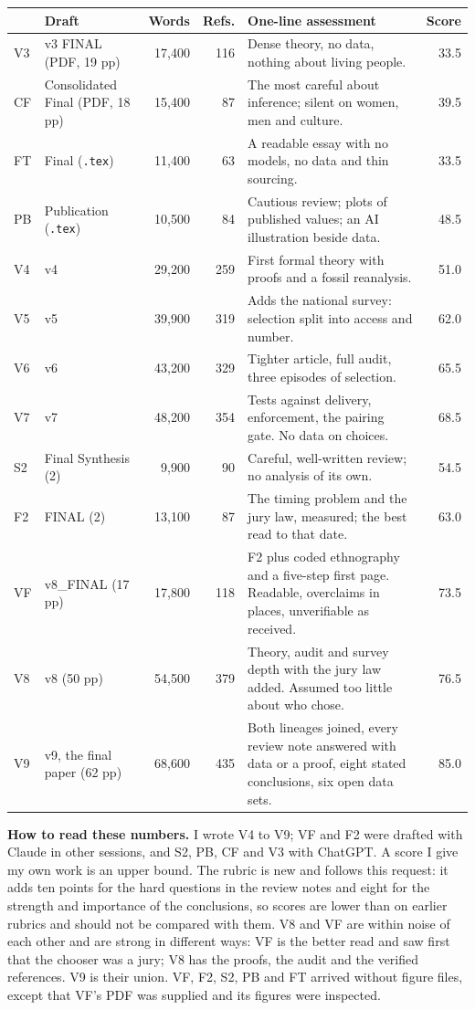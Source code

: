 \documentclass[10pt,letterpaper]{extarticle}
\newcommand{\TotVthree}{33.5}
\newcommand{\TotCF}{39.5}
\newcommand{\TotFT}{33.5}
\newcommand{\TotPB}{48.5}
\newcommand{\TotVfour}{51.0}
\newcommand{\TotVfive}{62.0}
\newcommand{\TotVsix}{65.5}
\newcommand{\TotVseven}{68.5}
\newcommand{\TotFtwo}{63.0}
\newcommand{\TotStwo}{54.5}
\newcommand{\TotVeight}{76.5}
\newcommand{\TotVF}{73.5}
\newcommand{\TotVnine}{85.0}
\begin{document}
\begin{tabularx}{\textwidth}{@{}P{0.035\textwidth}P{0.21\textwidth}rrLr@{}}
\toprule
 & Draft & Words & Refs. & One-line assessment & Score\\
\midrule
V3 & v3 FINAL (PDF, 19 pp) & 17{,}400 & 116 & Dense theory, no data, nothing about living people. & \TotVthree\\
CF & Consolidated Final (PDF, 18 pp) & 15{,}400 & 87 & The most careful about inference; silent on women, men and culture. & \TotCF\\
FT & Final (\texttt{.tex}) & 11{,}400 & 63 & A readable essay with no models, no data and thin sourcing. & \TotFT\\
PB & Publication (\texttt{.tex}) & 10{,}500 & 84 & Cautious review; plots of published values; an AI illustration beside data. & \TotPB\\
V4 & v4 & 29{,}200 & 259 & First formal theory with proofs and a fossil reanalysis. & \TotVfour\\
V5 & v5 & 39{,}900 & 319 & Adds the national survey: selection split into access and number. & \TotVfive\\
V6 & v6 & 43{,}200 & 329 & Tighter article, full audit, three episodes of selection. & \TotVsix\\
V7 & v7 & 48{,}200 & 354 & Tests against delivery, enforcement, the pairing gate. No data on choices. & \TotVseven\\
S2 & Final Synthesis (2) & 9{,}900 & 90 & Careful, well-written review; no analysis of its own. & \TotStwo\\
F2 & FINAL (2) & 13{,}100 & 87 & The timing problem and the jury law, measured; the best read to that date. & \TotFtwo\\
VF & v8\_FINAL (17 pp) & 17{,}800 & 118 & F2 plus coded ethnography and a five-step first page. Readable, overclaims in places, unverifiable as received. & \TotVF\\
V8 & v8 (50 pp) & 54{,}500 & 379 & Theory, audit and survey depth with the jury law added. Assumed too little about who chose. & \TotVeight\\
 V9 & v9, the final paper (62 pp) & 68{,}600 & 435 & Both lineages joined, every review note answered with data or a proof, eight stated conclusions, six open data sets. & \TotVnine\\
\bottomrule
\end{tabularx}

\textbf{How to read these numbers.} I wrote V4 to V9; VF and F2 were drafted with Claude in other sessions, and S2, PB, CF and
V3 with ChatGPT. A score I give my own work is an upper bound. The rubric is new and follows this request: it adds ten
points for the hard questions in the review notes and eight for the strength and importance of the conclusions, so scores
are lower than on earlier rubrics and should not be compared with them. V8 and VF are within noise of each other and are
strong in different ways: VF is the better read and saw first that the chooser was a jury; V8 has the proofs, the audit and
the verified references. V9 is their union. VF, F2, S2, PB and FT arrived without figure files, except that VF's PDF was
supplied and its figures were inspected.
\end{document}
